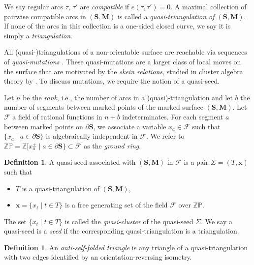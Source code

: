 \documentclass[pdftex]{sigma}
\numberwithin{equation}{section}
\theoremstyle{definition}
\newtheorem{Definition}[Theorem]{Definition}
\newcommand{\SM}{(\mathbf{S}, \mathbf{M})}
\begin{document}
We say regular arcs $\tau$, $\tau'$ are \textit{compatible} if $e(\tau, \tau') = 0$. A maximal collection of pairwise compatible arcs in $\SM$ is called a \textit{quasi-triangulation of $\SM$}. If none of the arcs in this collection is a one-sided closed curve, we say it is simply a \textit{triangulation}.

All (quasi-)triangulations of a non-orientable surface are reachable via sequences of \textit{quasi-mutations} \cite[Proposition 3.12]{DP15}. These quasi-mutations are a larger class of local moves on the surface that are motivated by the \textit{skein relations}, studied in cluster algebra theory by \cite{FST08, MW13}. To discuss mutations, we require the notion of a quasi-seed.

Let $n$ be the \textit{rank}, i.e., the number of arcs in a (quasi)-triangulation and let $b$ the number of segments between marked points of the marked surface $(\mathbf{S}, \mathbf{M})$. Let $\mathcal{F}$ a field of rational functions in $n+b$ indeterminates. For each segment $a$ between marked points on $\partial \mathbf{S}$, we associate a variable $x_a\in \mathcal{F}$ such that $\{x_a\mid a\in\partial\mathbf{S}\}$ is algebraically independent in $\mathcal{F}$. We refer to~${\mathbb{Z}\mathbb{P}=\mathbb{Z}\big[x_a^{\pm} \mid a\in\partial\mathbf{S}\big\}\subset\mathcal{F}}$ as the \textit{ground ring}.

\begin{Definition}\label{definition:quasiseed}
 A quasi-seed associated with $(\mathbf{S}, \mathbf{M})$ in $\mathcal{F}$ is a pair $\Sigma=(T, \mathbf{x})$ such that
 \begin{itemize}\itemsep=0pt
 \item $T$ is a quasi-triangulation of $(\mathbf{S},\mathbf{M})$,
 \item $\mathbf{x}=\{x_t \mid t\in T\}$ is a free generating set of the field $\mathcal{F}$ over $\mathbb{Z}\mathbb{P}$.
 \end{itemize}
 The set $\{x_t \mid t\in T\}$ is called the \textit{quasi-cluster} of the quasi-seed $\Sigma$. We say a quasi-seed is a \textit{seed} if the corresponding quasi-triangulation is a triangulation.
\end{Definition}

\begin{Definition}\label{anti-self-folded-triangle}
 An \textit{anti-self-folded triangle} is any triangle of a quasi-triangulation with two edges identified by an orientation-reversing isometry.
\end{Definition}
\end{document}
